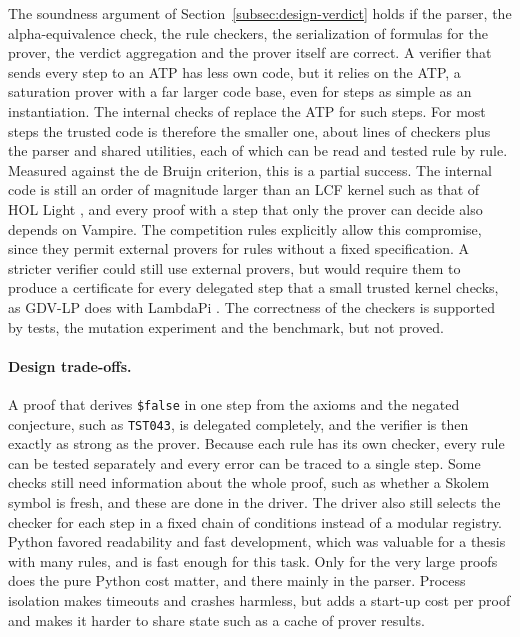 The soundness argument of Section~\ref{subsec:design-verdict} holds if the parser, the alpha-equivalence check, the rule checkers, the serialization of formulas for the prover, the verdict aggregation and the prover itself are correct.
A verifier that sends every step to an ATP has less own code, but it relies on the ATP, a saturation prover with a far larger code base, even for steps as simple as an instantiation.
The internal checks of \TSTPy{} replace the ATP for such steps. For most steps the trusted code is therefore the smaller one, about \EvalCheckerLines{} lines of checkers plus the parser and shared utilities, each of which can be read and tested rule by rule.
Measured against the de Bruijn criterion, this is a partial success.
The internal code is still an order of magnitude larger than an LCF kernel such as that of HOL Light \citep{Harrison2009HOLLight}, and every proof with a step that only the prover can decide also depends on Vampire.
The competition rules explicitly allow this compromise, since they permit external provers for rules without a fixed specification. A stricter verifier could still use external provers, but would require them to produce a certificate for every delegated step that a small trusted kernel checks, as GDV-LP does with LambdaPi \citep{Sutcliffe2025GDVLP}.
The correctness of the checkers is supported by tests, the mutation experiment and the benchmark, but not proved.

\paragraph{Design trade-offs.}
\label{subsec:disc-tradeoffs}

A proof that derives \texttt{\$false} in one step from the axioms and the negated conjecture, such as \texttt{TST043}, is delegated completely, and the verifier is then exactly as strong as the prover.
Because each rule has its own checker, every rule can be tested separately and every error can be traced to a single step.
Some checks still need information about the whole proof, such as whether a Skolem symbol is fresh, and these are done in the driver. The driver also still selects the checker for each step in a fixed chain of conditions instead of a modular registry.
Python favored readability and fast development, which was valuable for a thesis with many rules, and is fast enough for this task. Only for the very large proofs does the pure Python cost matter, and there mainly in the parser.
Process isolation makes timeouts and crashes harmless, but adds a start-up cost per proof and makes it harder to share state such as a cache of prover results.

